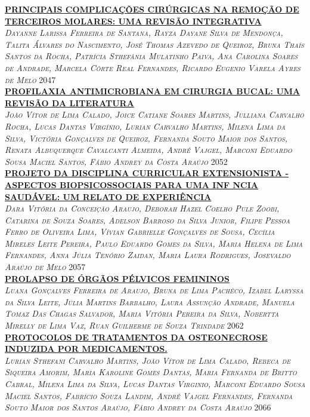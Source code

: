 \noindent \textsc{\hyperlink{trabalhos/249004.pdf.1}{\textbf{PRINCIPAIS COMPLICAÇÕES CIRÚRGICAS NA REMOÇÃO DE TERCEIROS MOLARES: UMA REVISÃO INTEGRATIVA}}}\\ 
\noindent \textsc{\textit{Dayanne Larissa Ferreira de Santana, Rayza Dayane Silva de Mendonça, Talita Álvares do Nascimento, José Thomas Azevedo de Queiroz, Bruna Thaís Santos da Rocha, Patrícia Sthefânia Mulatinho Paiva, Ana Carolina Soares de Andrade, Marcela Côrte Real Fernandes, Ricardo Eugenio Varela Ayres de Melo}} \hfill 2047\\ 

\noindent \textsc{\hyperlink{trabalhos/250177.pdf.1}{\textbf{PROFILAXIA ANTIMICROBIANA EM CIRURGIA BUCAL: UMA REVISÃO DA LITERATURA}}}\\ 
\noindent \textsc{\textit{João Vítor de Lima Calado, Joice Catiane Soares Martins, Julliana Carvalho Rocha, Lucas Dantas Virgínio, Lurian Carvalho Martins, Milena Lima da Silva, Victória Gonçalves de Queiroz, Fernanda Souto Maior dos Santos, Renata Albuquerque Cavalcanti Almeida, André Vajgel, Marconi Eduardo Sousa Maciel Santos, Fábio Andrey da Costa Araújo}} \hfill 2052\\ 

\noindent \textsc{\hyperlink{trabalhos/250169.pdf.1}{\textbf{PROJETO DA DISCIPLINA CURRICULAR EXTENSIONISTA - ASPECTOS BIOPSICOSSOCIAIS PARA UMA INF NCIA SAUDÁVEL: UM RELATO DE EXPERIÊNCIA  }}}\\ 
\noindent \textsc{\textit{Dara Vitória da Conceição Araujo, Deborah Hazel Coelho Pule Zoobi, Catarina de Souza Soares, Adelson Barroso da Silva Junior, Filipe Pessoa Ferro de Oliveira Lima, Vívian Gabrielle Gonçalves de Sousa, Cecília Mireles Leite Pereira, Paulo Eduardo Gomes da Silva, Maria Helena de Lima Fernandes, Anna Júlia Tenório Zaidan, Maria Laura Rodrigues, Josevaldo Araújo de Melo}} \hfill 2057\\ 

\noindent \textsc{\hyperlink{trabalhos/251703.pdf.1}{\textbf{PROLAPSO DE ÓRGÃOS PÉLVICOS FEMININOS}}}\\ 
\noindent \textsc{\textit{Luana Gonçalves Ferreira de Araujo, Bruna de Lima Pachêco, Izabel Laryssa da Silva Leite, Júlia Martins Barbalho, Laura Assunção Andrade, Manuela Tomaz Das Chagas Salvador, Maria Vitória Pereira da Silva, Nobertta Mirelly de Lima Vaz, Ruan Guilherme de Souza Trindade}} \hfill 2062\\ 

\noindent \textsc{\hyperlink{trabalhos/249647.pdf.1}{\textbf{PROTOCOLOS DE TRATAMENTOS DA OSTEONECROSE INDUZIDA POR MEDICAMENTOS. }}}\\ 
\noindent \textsc{\textit{Lurian Sthefani Carvalho Martins, João Vítor de Lima Calado, Rebeca de Siqueira Amorim, Maria Karoline Gomes Dantas, Maria Fernanda de Britto Cabral, Milena Lima da Silva, Lucas Dantas Virginio, Marconi Eduardo Sousa Maciel Santos, Fabrício Souza Landim, André Vajgel Fernandes, Fernanda Souto Maior dos Santos Araújo, Fábio Andrey da Costa Araújo}} \hfill 2066\\ 

